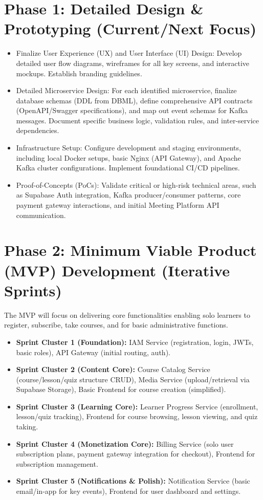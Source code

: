 \documentclass[12pt, a4paper]{report} %
\begin{document}
\begin{itemize}
\section{Phase 1: Detailed Design \& Prototyping (Current/Next Focus)}
  \begin{itemize}
    \item Finalize User Experience (UX) and User Interface (UI) Design: Develop detailed user flow diagrams, wireframes for all key screens, and interactive mockups. Establish branding guidelines.
    \item Detailed Microservice Design: For each identified microservice, finalize database schemas (DDL from DBML), define comprehensive API contracts (OpenAPI/Swagger specifications), and map out event schemas for Kafka messages. Document specific business logic, validation rules, and inter-service dependencies.
    \item Infrastructure Setup: Configure development and staging environments, including local Docker setups, basic Nginx (API Gateway), and Apache Kafka cluster configurations. Implement foundational CI/CD pipelines.
    \item Proof-of-Concepts (PoCs): Validate critical or high-risk technical areas, such as Supabase Auth integration, Kafka producer/consumer patterns, core payment gateway interactions, and initial Meeting Platform API communication.
  \end{itemize}
\section{Phase 2: Minimum Viable Product (MVP) Development (Iterative Sprints)}
  The MVP will focus on delivering core functionalities enabling solo learners to register, subscribe, take courses, and for basic administrative functions.
  \begin{itemize}
    \item \textbf{Sprint Cluster 1 (Foundation):} IAM Service (registration, login, JWTs, basic roles), API Gateway (initial routing, auth).
    \item \textbf{Sprint Cluster 2 (Content Core):} Course Catalog Service (course/lesson/quiz structure CRUD), Media Service (upload/retrieval via Supabase Storage), Basic Frontend for course creation (simplified).
    \item \textbf{Sprint Cluster 3 (Learning Core):} Learner Progress Service (enrollment, lesson/quiz tracking), Frontend for course browsing, lesson viewing, and quiz taking.
    \item \textbf{Sprint Cluster 4 (Monetization Core):} Billing Service (solo user subscription plans, payment gateway integration for checkout), Frontend for subscription management.
    \item \textbf{Sprint Cluster 5 (Notifications & Polish):} Notification Service (basic email/in-app for key events), Frontend for user dashboard and settings.
  \end{itemize}

\end{itemize}
\end{document}
